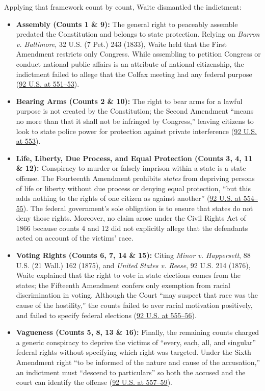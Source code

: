 \documentclass[12pt]{article}
\begin{document}
Applying that framework count by count, Waite dismantled the indictment:
\begin{itemize}
    \item \textbf{Assembly (Counts 1 \& 9):} The general right to peaceably assemble predated the Constitution and belongs to state protection. Relying on \textit{Barron v. Baltimore}, 32 U.S. (7 Pet.) 243 (1833), Waite held that the First Amendment restricts only Congress. While assembling to petition Congress or conduct national public affairs is an attribute of national citizenship, the indictment failed to allege that the Colfax meeting had any federal purpose (\href{https://supreme.justia.com/cases/federal/us/92/542/}{92 U.S. at 551--53}).
    \item \textbf{Bearing Arms (Counts 2 \& 10):} The right to bear arms for a lawful purpose is not created by the Constitution; the Second Amendment ``means no more than that it shall not be infringed by Congress,'' leaving citizens to look to state police power for protection against private interference (\href{https://supreme.justia.com/cases/federal/us/92/542/}{92 U.S. at 553}).
    \item \textbf{Life, Liberty, Due Process, and Equal Protection (Counts 3, 4, 11 \& 12):} Conspiracy to murder or falsely imprison within a state is a state offense. The Fourteenth Amendment prohibits \textit{states} from depriving persons of life or liberty without due process or denying equal protection, ``but this adds nothing to the rights of one citizen as against another'' (\href{https://supreme.justia.com/cases/federal/us/92/542/}{92 U.S. at 554--55}). The federal government's sole obligation is to ensure that states do not deny those rights. Moreover, no claim arose under the Civil Rights Act of 1866 because counts 4 and 12 did not explicitly allege that the defendants acted on account of the victims' race.
    \item \textbf{Voting Rights (Counts 6, 7, 14 \& 15):} Citing \textit{Minor v. Happersett}, 88 U.S. (21 Wall.) 162 (1875), and \textit{United States v. Reese}, 92 U.S. 214 (1876), Waite explained that the right to vote in state elections comes from the states; the Fifteenth Amendment confers only exemption from racial discrimination in voting. Although the Court ``may suspect that race was the cause of the hostility,'' the counts failed to aver racial motivation positively, and failed to specify federal elections (\href{https://supreme.justia.com/cases/federal/us/92/542/}{92 U.S. at 555--56}).
    \item \textbf{Vagueness (Counts 5, 8, 13 \& 16):} Finally, the remaining counts charged a generic conspiracy to deprive the victims of ``every, each, all, and singular'' federal rights without specifying which right was targeted. Under the Sixth Amendment right ``to be informed of the nature and cause of the accusation,'' an indictment must ``descend to particulars'' so both the accused and the court can identify the offense (\href{https://supreme.justia.com/cases/federal/us/92/542/}{92 U.S. at 557--59}).
\end{itemize}
\end{document}
